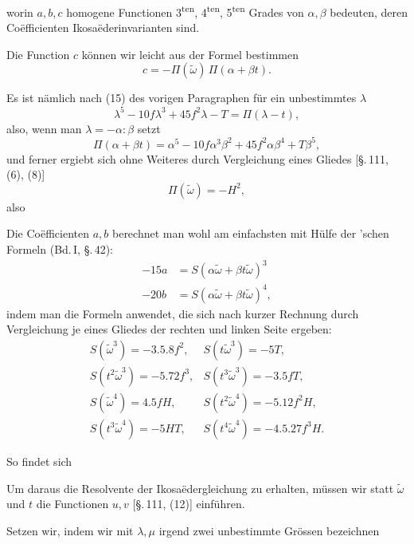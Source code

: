 
worin $a, b, c$ homogene Functionen 3\textsuperscript{ten}, 4\textsuperscript{ten}, 5\textsuperscript{ten} Grades von $\alpha, \beta$ bedeuten, deren Co\"efficienten Ikosa\"ederinvarianten sind.

Die Function $c$ k\"onnen wir leicht aus der Formel bestimmen
\[ c = -\Pi(\tilde\omega)\,\Pi(\alpha + \beta t). \]

Es ist n\"amlich nach (15) des vorigen Paragraphen f\"ur ein unbestimmtes $\lambda$
\[ \lambda^5 - 10f\lambda^3 + 45f^2\lambda - T = \Pi(\lambda - t), \]
also, wenn man $\lambda = -\alpha : \beta$ setzt
\[ \Pi(\alpha + \beta t) = \alpha^5 - 10f\alpha^3\beta^2 + 45f^2\alpha\beta^4 + T\beta^5, \]
und ferner ergiebt sich ohne Weiteres durch Vergleichung eines Gliedes [\S.\,111, (6), (8)]
\[ \Pi(\tilde\omega) = -H^2, \]
also

Die Co\"efficienten $a, b$ berechnet man wohl am einfachsten mit H\"ulfe der 'schen Formeln (Bd.\,I, \S.\,42):
\[
\begin{aligned}
-15a &= S(\alpha\tilde\omega + \beta t\tilde\omega)^3\\
-20b &= S(\alpha\tilde\omega + \beta t\tilde\omega)^4,
\end{aligned}
\]
indem man die Formeln anwendet, die sich nach kurzer Rechnung durch Vergleichung je eines Gliedes der rechten und linken Seite ergeben:
\[
\begin{array}{ll}
S(\tilde\omega^3) = -3.5.8f^2, & S(t\tilde\omega^3) = -5T,\\
S(t^2\tilde\omega^3) = -5.72f^3, & S(t^3\tilde\omega^3) = -3.5fT,\\
S(\tilde\omega^4) = 4.5fH, & S(t^2\tilde\omega^4) = -5.12f^2H,\\
S(t^3\tilde\omega^4) = -5HT, & S(t^4\tilde\omega^4) = -4.5.27f^3H.
\end{array}
\]

So findet sich

Um daraus die Resolvente der Ikosa\"edergleichung zu erhalten, m\"ussen wir statt $\tilde\omega$ und $t$ die Functionen $u, v$ [\S.\,111, (12)] einf\"uhren.

Setzen wir, indem wir mit $\lambda, \mu$ irgend zwei unbestimmte Gr\"ossen bezeichnen
